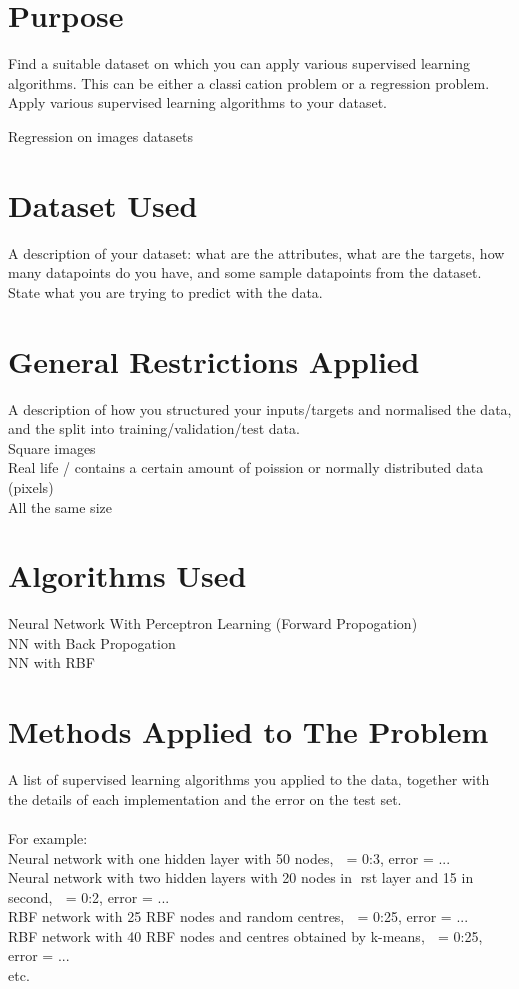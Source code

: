 \documentclass[11pt]{article}
\begin{document}
\begin{page}
\section{Purpose}
Find a suitable dataset on which you can apply various supervised learning algorithms.
This can be either a classication problem or a regression problem.
Apply various supervised learning algorithms to your dataset.

Regression on images datasets

\section{Dataset Used}
A description of your dataset: what are the attributes, what are the targets, how many
datapoints do you have, and some sample datapoints from the dataset. State what you are
trying to predict with the data.\\

\section{General Restrictions Applied}
A description of how you structured your inputs/targets and normalised the data, and the
split into training/validation/test data.\\

Square images\\
Real life / contains a certain amount of poission or normally distributed data (pixels)\\
All the same size\\

\section{Algorithms Used}
Neural Network With Perceptron Learning (Forward Propogation)\\
NN with Back Propogation\\
NN with RBF\\

\section{Methods Applied to The Problem}
A list of supervised learning algorithms you applied to the data, together with the details
of each implementation and the error on the test set.\\\\
For example:\\
Neural network with one hidden layer with 50 nodes,  = 0:3, error = ...\\
Neural network with two hidden layers with 20 nodes in rst layer and 15 in second,  = 0:2,
error = ...\\
RBF network with 25 RBF nodes and random centres,  = 0:25, error = ...\\
RBF network with 40 RBF nodes and centres obtained by k-means,  = 0:25, error = ...\\
etc.\\


\end{page}
\end{document}
